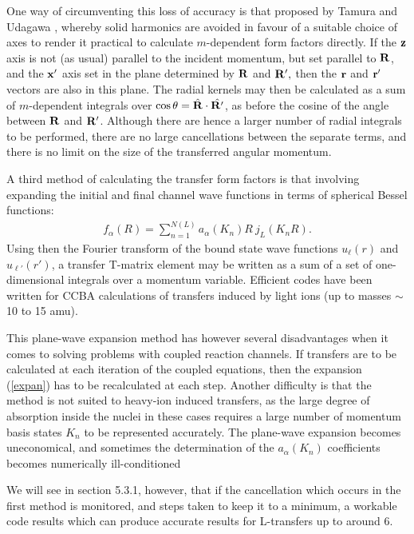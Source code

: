 \documentclass[11pt,a4paper]{article}
\newcommand{\vecr}{{\bf r}}
\newcommand{\vecR}{{\bf R}}
\newcommand{\vecx}{{\bf x}}
\begin{document}
One way of circumventing this loss of accuracy is that proposed by
Tamura and Udagawa \cite{TUM}, whereby solid harmonics are avoided in favour of a suitable
choice of axes to render it practical to calculate $m$-dependent
form factors directly.  If the ${\bf z} $ axis is not (as
usual) parallel to the incident momentum, but set parallel to
$\vecR$, and the $\vecx' $ axis set in the plane determined
by $\vecR $ and $ \vecR' ,$ then the $\vecr $ and $ \vecr'$
vectors are also in this plane.
The radial kernels may then be calculated as a sum of $m$-dependent
integrals over $ \cos \theta = \hat \vecR \cdot \hat{\vecR'} $,
as before the cosine of the angle between $\vecR $ and $ \vecR'$.
Although there are hence a larger number of radial integrals to be
performed, there are no large cancellations between the separate terms,
and there is no limit on the size of the transferred angular momentum.

A third method \cite{robson72}
of calculating the transfer form factors is that involving
expanding the initial and final channel wave functions in terms of
spherical Bessel functions:
\begin{eqnarray} \label{expan}
f _\alpha (R) = \sum_{n=1}^ {N(L)} {a _\alpha (K_n) R ~
                j_L (K_n R) } .
\end{eqnarray}
Using then the Fourier transform of the bound state wave functions
$ u_\ell (r) $ and $ u_{\ell'} (r')$,
a transfer T-matrix element may be written as a sum of a set of
one-dimensional integrals over a momentum variable.
Efficient codes \cite{nagel76}
have been written for CCBA calculations of transfers induced by light
ions (up to masses $\sim$ 10 to 15 amu).

This plane-wave expansion method has however several disadvantages  when
it comes to solving problems with coupled reaction channels.   If
transfers are to be calculated at each iteration of the coupled
equations, then the expansion (\ref{expan}) has to be recalculated at each step.
Another difficulty is that the method is not suited to heavy-ion induced
transfers, as the large degree of absorption inside the nuclei in these
cases requires a large number of momentum basis states  $ K_n $
to be represented accurately. The plane-wave expansion  becomes
uneconomical, and sometimes the determination of the
$ a _\alpha (K_n)$ coefficients becomes numerically ill-conditioned

We will see in section 5.3.1, however, that
if the cancellation which occurs in the first method is monitored,
and steps taken to keep it to a minimum, a workable code
\cite{FRESCO}
results which can produce accurate results for L-transfers up to around 6.
\end{document}
